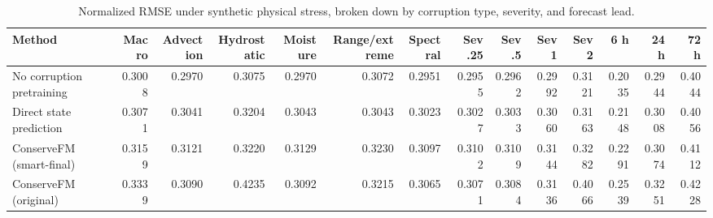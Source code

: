 \begin{table}
\caption{Normalized RMSE under synthetic physical stress, broken down by corruption type, severity, and forecast lead.}
\label{tab:stress_breakdown}
\begin{tabular}{lrrrrrrrrrrrrr}
\toprule
Method & Macro & Advection & Hydrostatic & Moisture & Range/extreme & Spectral & Sev .25 & Sev .5 & Sev 1 & Sev 2 & 6 h & 24 h & 72 h \\
\midrule
No corruption pretraining & 0.3008 & 0.2970 & 0.3075 & 0.2970 & 0.3072 & 0.2951 & 0.2955 & 0.2962 & 0.2992 & 0.3121 & 0.2035 & 0.2944 & 0.4044 \\
Direct state prediction & 0.3071 & 0.3041 & 0.3204 & 0.3043 & 0.3043 & 0.3023 & 0.3027 & 0.3033 & 0.3060 & 0.3163 & 0.2148 & 0.3008 & 0.4056 \\
ConserveFM (smart-final) & 0.3159 & 0.3121 & 0.3220 & 0.3129 & 0.3230 & 0.3097 & 0.3102 & 0.3109 & 0.3144 & 0.3282 & 0.2291 & 0.3074 & 0.4112 \\
ConserveFM (original) & 0.3339 & 0.3090 & 0.4235 & 0.3092 & 0.3215 & 0.3065 & 0.3071 & 0.3084 & 0.3136 & 0.4066 & 0.2539 & 0.3251 & 0.4228 \\
\bottomrule
\end{tabular}
\end{table}
